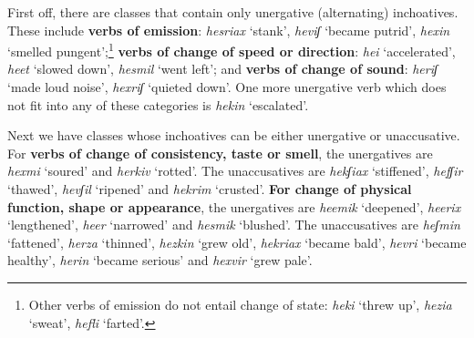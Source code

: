 First off, there are classes that contain only unergative (alternating) inchoatives. These include \textbf{verbs of emission}: \emph{hesriax} `stank', \emph{heviʃ} `became putrid', \emph{he{\texttslig}xin} `smelled pungent';\footnote{Other verbs of emission do not entail change of state: \emph{heki} `threw up', \emph{hezia} `sweat', \emph{hefli{\texttslig}} `farted'.} %
\textbf{verbs of change of speed or direction}: \emph{hei{\texttslig}} `accelerated', \emph{heet} `slowed down', \emph{hesmil} `went left'; %
and \textbf{verbs of change of sound}: \emph{heriʃ} `made loud noise', \emph{hexriʃ} `quieted down'. %
One more unergative verb which does not fit into any of these categories is \emph{hek{\texttslig}in} `escalated'.

Next we have classes whose inchoatives can be either unergative or unaccusative. For
\textbf{verbs of change of consistency, taste or smell}, the unergatives are \emph{hexmi{\texttslig}} `soured' and \emph{herkiv} `rotted'. The unaccusatives are \emph{hekʃiax} `stiffened', \emph{hefʃir} `thawed', \emph{hevʃil} `ripened' and \emph{hekrim} `crusted'. %
\textbf{For change of physical function, shape or appearance}, the unergatives are \emph{heemik} `deepened', \emph{heerix} `lengthened', \emph{he{\texttslig}er} `narrowed' and \emph{hesmik} `blushed'. The unaccusatives are \emph{heʃmin} `fattened', \emph{herza} `thinned', \emph{hezkin} `grew old', \emph{hekriax} `became bald', \emph{hevri} `became healthy', \emph{her{\texttslig}in} `became serious' and \emph{hexvir} `grew pale'. %

